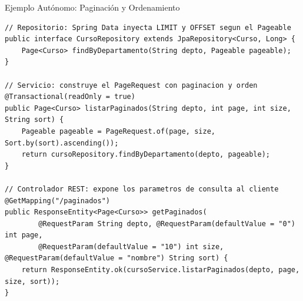 \documentclass[aspectratio=169]{beamer}
\begin{document}
\begin{frame}[fragile]{Ejemplo Aut\'onomo: Paginaci\'on y Ordenamiento}
\begin{lstlisting}[style=SpringCodeStyle]
// Repositorio: Spring Data inyecta LIMIT y OFFSET segun el Pageable
public interface CursoRepository extends JpaRepository<Curso, Long> {
    Page<Curso> findByDepartamento(String depto, Pageable pageable);
}

// Servicio: construye el PageRequest con paginacion y orden
@Transactional(readOnly = true)
public Page<Curso> listarPaginados(String depto, int page, int size, String sort) {
    Pageable pageable = PageRequest.of(page, size, Sort.by(sort).ascending());
    return cursoRepository.findByDepartamento(depto, pageable);
}

// Controlador REST: expone los parametros de consulta al cliente
@GetMapping("/paginados")
public ResponseEntity<Page<Curso>> getPaginados(
        @RequestParam String depto, @RequestParam(defaultValue = "0") int page,
        @RequestParam(defaultValue = "10") int size, @RequestParam(defaultValue = "nombre") String sort) {
    return ResponseEntity.ok(cursoService.listarPaginados(depto, page, size, sort));
}
\end{lstlisting}
\end{frame}

\end{document}
